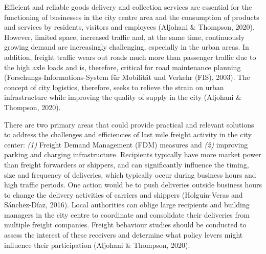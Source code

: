 \documentclass[
]{book}
\begin{document}
Efficient and reliable goods delivery and collection services are essential for the functioning of businesses in the city centre area and the consumption of products and services by residents, visitors and employees (Aljohani \& Thompson, 2020). However, limited space, increased traffic and, at the same time, continuously growing demand are increasingly challenging, especially in the urban areas. In addition, freight traffic wears out roads much more than passenger traffic due to the high axle loads and is, therefore, critical for road maintenance planning (Forschungs-Informations-System für Mobilität und Verkehr (FIS), 2003). The concept of city logistics, therefore, seeks to relieve the strain on urban infrastructure while improving the quality of supply in the city (Aljohani \& Thompson, 2020).

There are two primary areas that could provide practical and relevant solutions to address the challenges and efficiencies of last mile freight activity in the city center: \emph{(1)} Freight Demand Management (FDM) measures and \emph{(2)} improving parking and charging infrastructure. Recipients typically have more market power than freight forwarders or shippers, and can significantly influence the timing, size and frequency of deliveries, which typically occur during business hours and high traffic periods. One action would be to push deliveries outside business hours to change the delivery activities of carriers and shippers (Holguín-Veras and Sánchez-Díaz, 2016). Local authorities can oblige large recipients and building managers in the city centre to coordinate and consolidate their deliveries from multiple freight companies. Freight behaviour studies should be conducted to assess the interest of these receivers and determine what policy levers might influence their participation (Aljohani \& Thompson, 2020).
\end{document}

